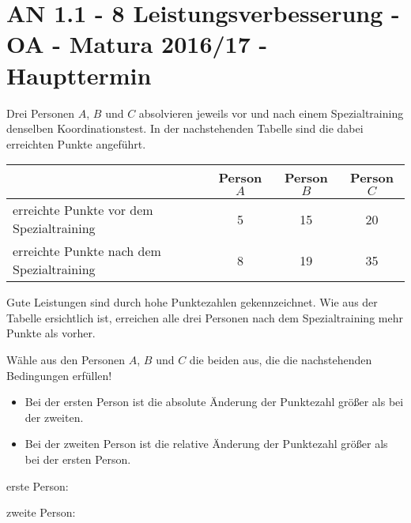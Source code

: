 \section{AN 1.1 - 8 Leistungsverbesserung - OA - Matura 2016/17 - Haupttermin}

\begin{beispiel}[AN 1.1]{1} %
Drei Personen $A$, $B$ und $C$ absolvieren jeweils vor und nach einem Spezialtraining denselben
Koordinationstest. In der nachstehenden Tabelle sind die dabei erreichten Punkte angeführt.

\begin{tabular}{|l|c|c|c|}\hhline{~|---}
\multicolumn{1}{c|}{}& \cellcolor{black!20} Person $A$ & \cellcolor{black!20}Person $B$ & \cellcolor{black!20}Person $C$ \\ \hline
\cellcolor{black!20}erreichte Punkte vor dem Spezialtraining & 5 & 15 & 20 \\ \hline
\cellcolor{black!20}erreichte Punkte nach dem Spezialtraining & 8 & 19 & 35 \\ \hline
\end{tabular}\leer

Gute Leistungen sind durch hohe Punktezahlen gekennzeichnet. Wie aus der Tabelle ersichtlich
ist, erreichen alle drei Personen nach dem Spezialtraining mehr Punkte als vorher. \leer

Wähle aus den Personen $A$, $B$ und $C$ die beiden aus, die die nachstehenden Bedingungen
erfüllen! 

\begin{itemize}
	\item Bei der ersten Person ist die absolute Änderung der Punktezahl größer als bei der zweiten.
	\item Bei der zweiten Person ist die relative Änderung der Punktezahl größer als bei der ersten Person.
\end{itemize}

erste Person: 

zweite Person: 
\end{beispiel}